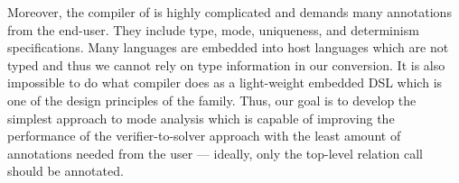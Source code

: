 Moreover, the compiler of \merc is highly complicated and demands many annotations from the end-user.
They include type, mode, uniqueness, and determinism specifications.
Many \mk languages are embedded into host languages which are not typed and thus we cannot rely on type information in our conversion.
It is also impossible to do what \merc compiler does as a light-weight embedded DSL which is one of the design principles of the \mk family.
Thus, our goal is to develop the simplest approach to mode analysis which is capable of improving the performance of the verifier-to-solver approach with the least amount of annotations needed from the user --- ideally, only the top-level relation call should be annotated.




